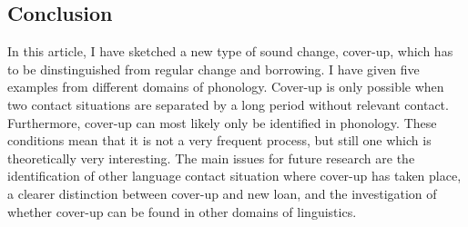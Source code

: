 \documentclass[a4paper,10pt]{article}
\begin{document}
\subsection{Conclusion} 
In this article, I have sketched a new type of sound change, cover-up, which has to be dinstinguished from regular change and borrowing. I have given five examples from different domains of phonology. Cover-up is only possible when two contact situations are separated by a long period without relevant contact. Furthermore, cover-up can most likely only be identified in phonology. These conditions mean that it is not a very frequent process, but still one which is theoretically very interesting.
The main issues for future research are the identification of other language contact situation where cover-up has taken place, a clearer distinction between cover-up and new loan, and the investigation of whether cover-up can be found in other domains of linguistics.  





\end{document}
